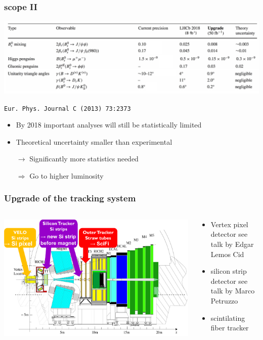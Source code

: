 \documentclass[table,xcolor=dvipsnames,professionalfonts]{beamer}
\begin{document}
    \begin{frame}
      \frametitle{scope II}
      \includegraphics[width=\textwidth]{./alessiotable.pdf}

      {\footnotesize{\texttt{Eur. Phys. Journal C (2013) 73:2373}}}

      \begin{itemize}
          \item By 2018 important analyses will still be statistically limited
          \item Theoretical uncertainty smaller than experimental
          \item[$\rightarrow$] Significantly more statistics needed
          \item[$\Rightarrow$] Go to higher luminosity
      \end{itemize}
    \end{frame}


    \begin{frame}
      \frametitle{Upgrade of the tracking system}
      \begin{columns}
        \begin{column}{.7\textwidth}
          \includegraphics[width=\textwidth]{./LHCb2.pdf}
        \end{column}
        \begin{column}{.3\textwidth}
            \begin{itemize}
              \item Vertex pixel detector
                \newline see talk by Edgar Lemos Cid
              \item silicon strip detector
                \newline see talk by Marco Petruzzo
              \item scintilating fiber tracker
            \end{itemize}
          \end{column}
        \end{columns}
      \end{frame}
\end{document}
